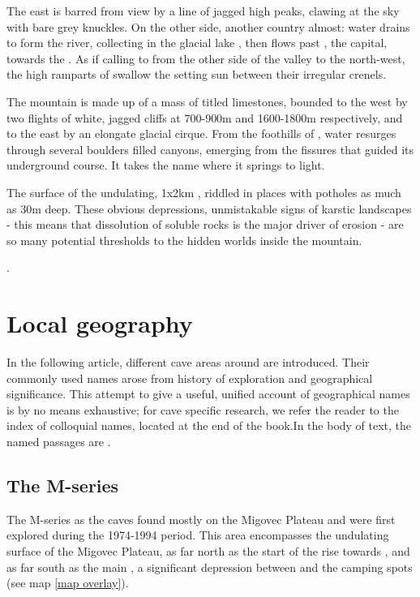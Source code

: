 The east is barred from view by a line of jagged high peaks, clawing at the sky with bare grey knuckles. On the other side, another country almost: water drains to form the \passage{} river, collecting in the glacial lake , then flows past , the capital, towards the . As if calling to  from the other side of the  valley to the north-west, the high ramparts of  swallow the setting sun between their irregular crenels.

The mountain is made up of a mass of titled limestones, bounded to the west by two flights of white, jagged cliffs at 700-900m and 1600-1800m respectively, and to the east by an elongate glacial cirque. From the foothills of , water resurges through several boulders filled canyons, emerging from the fissures that guided its underground course. It takes the name  where it springs to light.  

The surface of the undulating, 1x2km , riddled in places with potholes as much as 30m deep. These obvious depressions, unmistakable signs of karstic landscapes - this means that dissolution of soluble rocks is the major driver of erosion  - are so many potential thresholds to the hidden worlds inside the mountain.

. 

\section{Local geography}
In the following article, different cave areas around  are introduced. Their commonly used names arose from history of exploration and geographical significance. This attempt to give a useful, unified account of geographical names is by no means exhaustive; for cave specific research, we refer the reader to the index of colloquial names, located at the end of the book.In the body of text, the named passages are .

\subsection{The M-series} 
The M-series as the caves found mostly on the Migovec Plateau and were first explored during the 1974-1994 period. This area encompasses the undulating surface of the Migovec Plateau, as far north as the start of the rise towards \protect{}, and as far south as the main \protect{}, a significant depression between \protect{} and the camping spots (see map \ref{map overlay}).


